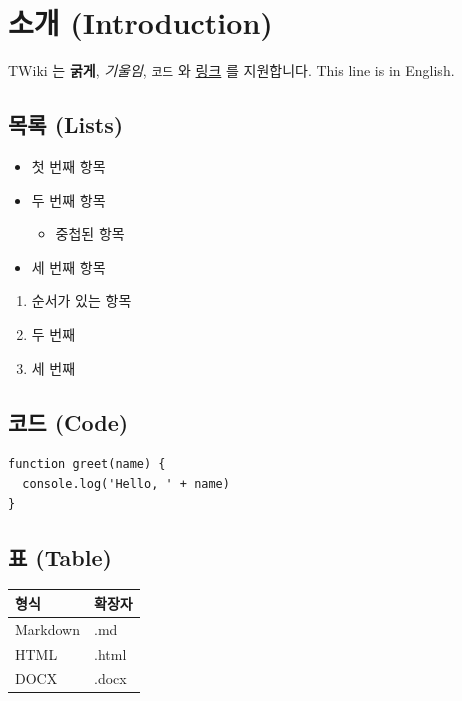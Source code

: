 \documentclass[11pt]{article}
\date{}
\begin{document}
\section*{소개 (Introduction)}\label{소개-introduction}

TWiki 는 \textbf{굵게}, \emph{기울임}, \verb|코드| 와
\href{https://example.com}{링크} 를 지원합니다.
This line is in English.

\subsection*{목록 (Lists)}\label{목록-lists}

\begin{itemize}
\item 첫 번째 항목
\item 두 번째 항목
\begin{itemize}
\item 중첩된 항목
\end{itemize}
\item 세 번째 항목
\end{itemize}

\begin{enumerate}
\item 순서가 있는 항목
\item 두 번째
\item 세 번째
\end{enumerate}

\subsection*{코드 (Code)}\label{코드-code}

\begin{verbatim}
function greet(name) {
  console.log('Hello, ' + name)
}
\end{verbatim}

\subsection*{표 (Table)}\label{표-table}

\begin{table}[htbp]
\centering
\begin{tabular}{ll}
\toprule
형식 & 확장자 \\
\midrule
Markdown & .md \\
HTML & .html \\
DOCX & .docx \\
\bottomrule
\end{tabular}
\end{table}
\end{document}
